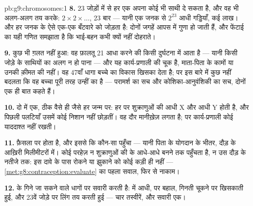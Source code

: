 \begin{solution}{pb:g9:chromosomes:1}
\textbf{8.} 23 जोड़ों में से हर एक अपना कोई भी साथी दे सकता है, और वह भी
अलग-अलग तय करके: $2 \times 2 \times \dots$, 23 बार --- यानी एक जनक से
$2^{23}$ आधी गड्डियाँ, कई लाख। और  हर जनक के ऐसे एक-एक बँटवारे को
जोड़ता है: दोनों जगहें आपस में गुणा हो जाती हैं, और फेंटाई का यही गणित
समझाता है कि भाई-बहन कभी क्यों नहीं दोहराते।

\textbf{9.} कुछ भी ग़लत नहीं हुआ: वह फ़ालतू 21 आधा करने की किसी
दुर्घटना में आता है --- यानी किसी जोड़े के साथियों का अलग न हो पाना ---
और यह कार्य-प्रणाली की चूक है, माता-पिता के कामों या उनकी क़ीमत की नहीं।
वह 47वाँ धागा बच्चे का विकास खिसका देता है; पर इस बारे में कुछ नहीं बदलता
कि वह बच्चा पूरी तरह उन्हीं का है --- परामर्श का सच और कोशिका-आनुवंशिकी
का सच, दोनों एक ही बात कहते हैं।

\textbf{10.} दो में एक, ठीक वैसे ही जैसे हर जन्म पर: हर  पर
शुक्राणुओं की  आधी X और आधी Y होती है, और पिछली पलटियाँ उसमें कोई
निशान नहीं छोड़तीं। वह दौर मानीख़ेज़ लगता है; पर कार्य-प्रणाली कोई
याददाश्त नहीं रखती।

\textbf{11.} फ़ैसला  पर होता है, और इससे कि कौन-सा  पहुँचा
--- यानी पिता के योगदान के भीतर, दौड़ के आख़िरी मिलीमीटरों में। कोई
परहेज़ न शुक्राणुओं की  के आधे-आधे बनने तक पहुँचता है, न उस दौड़ के
नतीजे तक: इस दावे के पास रोकने या झुकाने को कोई कड़ी ही नहीं ---
\cref{met:g8:contraception:evaluate} का पहला सवाल, फिर से नाकाम।

\textbf{12.}   के गिने जा सकने वाले धागों पर सवारी करती
है:  में आधी,  पर बहाल, गिनती चूकने पर  खिसकाती हुई,
और 23वें जोड़े पर लिंग तय करती हुई --- चार तस्वीरें, और सवारी एक।
\end{solution}
